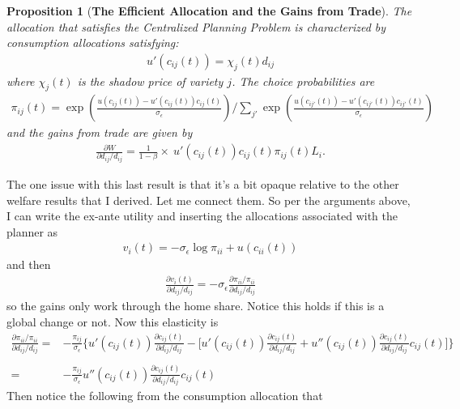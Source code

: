\documentclass[12pt,pdftex]{article}
\newtheorem{prp}{Proposition}
\begin{document}
\begin{onehalfspacing}
\begin{prp}[\textbf{The Efficient Allocation and the Gains from Trade}] The allocation that satisfies the Centralized Planning Problem is characterized by consumption allocations satisfying:
\begin{align}
u'(c_{ij}(t) ) = \chi_{j}(t) d_{ij} \nonumber
\end{align}
where $\chi_{j}(t)$ is the shadow price of variety $j$. The choice probabilities are
\begin{align}
\pi_{ij}(t) =\exp \left( \frac{u(c_{ij}(t)) - u'(c_{ij}(t))c_{ij}(t)}{\sigma_{\epsilon}}\right) \bigg / \sum_{j'}\exp \left( \frac{u(c_{ij'}(t)) - u'(c_{ij'}(t))c_{ij'}(t)}{\sigma_{\epsilon}} \right)
\nonumber
\end{align}
and the gains from trade are given by
\begin{align}
\frac{\partial W}{\partial d_{ij} / d_{ij}} = \frac{1}{1-\beta} \times \ u'(c_{ij}(t)) c_{ij}(t) \pi_{ij}(t) L_{i}.
\nonumber
\end{align}
\end{prp}
The one issue with this last result is that it's a bit opaque relative to the other welfare results that I derived. Let me connect them. So per the arguments above, I can write the ex-ante utility  and inserting the allocations associated with the planner as
\begin{align}
v_i(t) = -\sigma_{\epsilon} \log \pi_{ii} + u(c_{ii}(t))
\end{align}
and then
\begin{align}
\frac{\partial v_i(t)}{\partial d_{ij} / d_{ij}} = -\sigma_{\epsilon} \frac{\partial \pi_{ii} / \pi_{ii}}{\partial d_{ij} / d_{ij}}
\end{align}
so the gains only work through the home share. Notice this holds if this is a global change or not. Now this elasticity is
\begin{align}
\frac{\partial \pi_{ii} / \pi_{ii}}{\partial d_{ij} / d_{ij}} =& -\frac{\pi_{ij}}{\sigma_{\epsilon}} \bigg \{ u'(c_{ij}(t))\frac{\partial c_{ij}(t)}{\partial d_{ij} / d_{ij}} - \bigg [u'(c_{ij}(t))\frac{\partial c_{ij}(t)}{\partial d_{ij} / d_{ij}} + u''(c_{ij}(t))\frac{\partial c_{ij}(t)}{\partial d_{ij} / d_{ij}}c_{ij}(t) \bigg ] \bigg \} \\
\nonumber \\
=& -\frac{\pi_{ij}}{\sigma_{\epsilon}}u''(c_{ij}(t))\frac{\partial c_{ij}(t)}{\partial d_{ij} / d_{ij}}c_{ij}(t)
\end{align}
Then notice the following from the consumption allocation that

\end{onehalfspacing}
\end{document}

